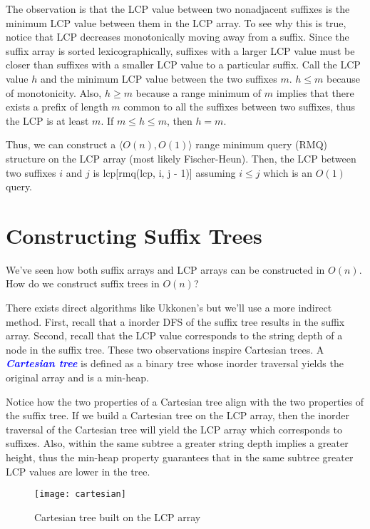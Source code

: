 \documentclass[11pt, oneside]{article}
\newcommand{\emphasis}[1]{\textcolor{blue}{\textbf{\textit{#1}}}}
\begin{document}
The observation is that the LCP value between two nonadjacent suffixes
is the minimum LCP value between them in the LCP array.
To see why this is true, notice that LCP decreases monotonically moving away from a suffix.
Since the suffix array is sorted lexicographically, suffixes with a larger LCP
value must be closer than suffixes with a smaller LCP value to a particular suffix.
Call the LCP value \( h \) and the minimum LCP value between the two suffixes \( m \).
\( h \leq m \) because of monotonicity.
Also, \( h \geq m \) because a range minimum of \( m \) implies that there exists a prefix of length \( m \)
common to all the suffixes between two suffixes, thus the LCP is at least \( m \).
If \( m \leq h \leq m \), then \( h = m \).

Thus, we can construct a \( \langle O(n), O(1) \rangle \) range minimum query (RMQ) structure
on the LCP array (most likely Fischer-Heun).
Then, the LCP between two suffixes \( i \) and \( j \) is lcp[rmq(lcp, i, j - 1)] assuming \( i \leq j \)
which is an \( O(1) \) query.

\section{Constructing Suffix Trees}

We've seen how both suffix arrays and LCP arrays can be constructed in \( O(n) \). \\
How do we construct suffix trees in \( O(n) \)?

There exists direct algorithms like Ukkonen’s but we'll use a more indirect method.
First, recall that a inorder DFS of the suffix tree results in the suffix array.
Second, recall that the LCP value corresponds to the string depth of a node in the suffix tree.
These two observations inspire Cartesian trees.
A \emphasis{Cartesian tree} is defined as a binary tree whose inorder traversal yields the original array and is a min-heap.

Notice how the two properties of a Cartesian tree align with the two properties of the suffix tree.
If we build a Cartesian tree on the LCP array, then the inorder traversal of the Cartesian tree
will yield the LCP array which corresponds to suffixes.
Also, within the same subtree a greater string depth implies a greater height,
thus the min-heap property guarantees that in the same subtree greater LCP values are lower in the tree.

\begin{figure}[h!]
\centering
\texttt{[image: cartesian]}
\caption{Cartesian tree built on the LCP array}
\end{figure}
\end{document}

